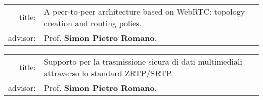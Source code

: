 \documentclass{paucv}
\begin{document}
\makeinfos\

\bigskip\bigskip\bigskip\bigskip

\begin{cvsection}
  \begin{timeline}
    \eventseparator
    \eventseparator
  \end{timeline}
  \fontsize{12pt}{15pt}\selectfont
  \begin{tabular}{r l}
    title: & A peer-to-peer architecture based on WebRTC: topology creation
    and routing polies.\\
    advisor: & Prof. {\bf Simon Pietro Romano}.
  \end{tabular}
  \begin{tabular}{r l}
    title: & Supporto per la trasmissione sicura di dati multimediali attraverso
    lo standard ZRTP/SRTP.\\
    advisor: & Prof. {\bf Simon Pietro Romano}.
  \end{tabular}
\end{cvsection}

\begin{cvsection}
\end{cvsection}
\end{document}
